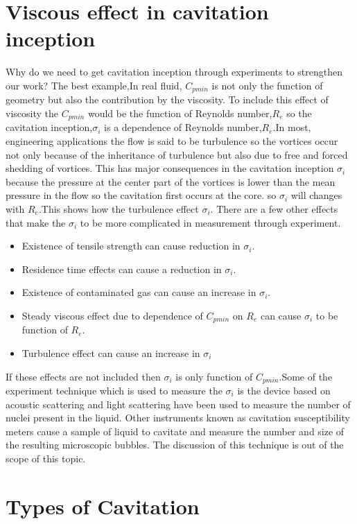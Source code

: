   \section{Viscous effect in cavitation inception}
  Why do we need to get cavitation inception through experiments to strengthen our work?
  The best example,In real fluid, $C_{pmin}$ is not only the function of geometry but also the contribution by the viscosity. To include this effect of viscosity the $C_{pmin}$ would be the function of 
  Reynolds number,$R_e$ so the cavitation inception,${\sigma}_i$ is a dependence of Reynolds number,$R_e$.In most,  engineering applications the flow is said to be turbulence so the vortices occur not only 
  because of the inheritance of turbulence but also due to free and forced shedding of vortices. This has major consequences in the cavitation inception ${\sigma}_i$ because the pressure at the center part of the 
  vortices is lower than the mean pressure in the flow so the cavitation first occurs at the core. so ${\sigma}_i$ will changes with $R_e$.This shows how the turbulence effect ${\sigma}_i$. There are a few other effects that 
  make the ${\sigma}_i$ to be more complicated in measurement through experiment.
  \begin{itemize}
  \item Existence of tensile strength can cause reduction in ${\sigma}_i$.
  \item Residence time effects can cause a reduction in ${\sigma}_i$.
  \item Existence of contaminated gas can cause an increase in ${\sigma}_i$.
  \item Steady viscous effect due to dependence of $C_{pmin}$ on $R_e$ can cause ${\sigma}_i$ to be function of $R_e$.
  \item Turbulence effect can cause an increase in ${\sigma}_i$
  \end{itemize}
  If these effects are not included then ${\sigma}_i$ is only function of $C_{pmin}$.Some of the experiment technique which is used to measure the ${\sigma}_i$ is the device based on acoustic scattering and light
  scattering have been used to measure the number of nuclei present in the liquid. Other instruments known as cavitation susceptibility meters cause a sample of liquid to cavitate and measure the number and size of the 
  resulting microscopic bubbles. The discussion of this technique is out of the scope of this topic.
  \section{Types of Cavitation}
